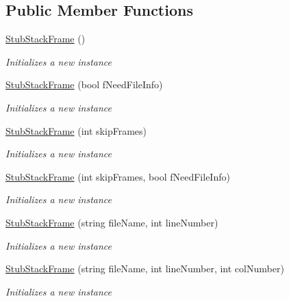 \subsection*{Public Member Functions}
\begin{DoxyCompactItemize}
\item 
\hyperlink{class_system_1_1_diagnostics_1_1_fakes_1_1_stub_stack_frame_a3e0bdaafd0e152aa8bf376856e355b7d}{Stub\-Stack\-Frame} ()
\begin{DoxyCompactList}\small\item\em Initializes a new instance\end{DoxyCompactList}\item 
\hyperlink{class_system_1_1_diagnostics_1_1_fakes_1_1_stub_stack_frame_a572c4be09c714330e66f6248ec588849}{Stub\-Stack\-Frame} (bool f\-Need\-File\-Info)
\begin{DoxyCompactList}\small\item\em Initializes a new instance\end{DoxyCompactList}\item 
\hyperlink{class_system_1_1_diagnostics_1_1_fakes_1_1_stub_stack_frame_aac9aa8b8a3c4fc92454106fd0e3ec4d3}{Stub\-Stack\-Frame} (int skip\-Frames)
\begin{DoxyCompactList}\small\item\em Initializes a new instance\end{DoxyCompactList}\item 
\hyperlink{class_system_1_1_diagnostics_1_1_fakes_1_1_stub_stack_frame_a87fc1b101a57deea46beb07548bd7d9d}{Stub\-Stack\-Frame} (int skip\-Frames, bool f\-Need\-File\-Info)
\begin{DoxyCompactList}\small\item\em Initializes a new instance\end{DoxyCompactList}\item 
\hyperlink{class_system_1_1_diagnostics_1_1_fakes_1_1_stub_stack_frame_a309a87ebeb699cd260f2e888d30fa97b}{Stub\-Stack\-Frame} (string file\-Name, int line\-Number)
\begin{DoxyCompactList}\small\item\em Initializes a new instance\end{DoxyCompactList}\item 
\hyperlink{class_system_1_1_diagnostics_1_1_fakes_1_1_stub_stack_frame_a2c4d7bee41d9f5396b8f95daf73fa98b}{Stub\-Stack\-Frame} (string file\-Name, int line\-Number, int col\-Number)
\begin{DoxyCompactList}\small\item\em Initializes a new instance\end{DoxyCompactList}\item 

\end{DoxyCompactItemize}
